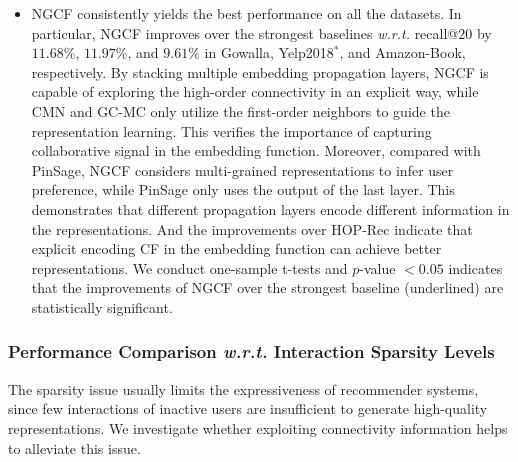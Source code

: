 \documentclass[sigconf]{acmart}
\newcommand{\wrt}{\emph{w.r.t. }}
\theoremstyle{definition}
\begin{document}
\begin{itemize}[leftmargin=*]
\item NGCF consistently yields the best performance on all the datasets.
In particular, NGCF improves over the strongest baselines \wrt recall@$20$ by $11.68\%$, $11.97\%$, and $9.61\%$ in Gowalla, Yelp2018$^{*}$, and Amazon-Book, respectively.
By stacking multiple embedding propagation layers, NGCF is capable of exploring the high-order connectivity in an explicit way, while CMN and GC-MC only utilize the first-order neighbors to guide the representation learning.
This verifies the importance of capturing collaborative signal in the embedding function.
Moreover, compared with PinSage, NGCF considers multi-grained representations to infer user preference, while PinSage only uses the output of the last layer.
This demonstrates that different propagation layers encode different information in the representations.
And the improvements over HOP-Rec indicate that explicit encoding CF in the embedding function can achieve better representations.
We conduct one-sample t-tests and $p$-value $<0.05$ indicates that the improvements of NGCF over the strongest baseline (underlined) are statistically significant.

\end{itemize}


\subsubsection{\textbf{Performance Comparison \wrt Interaction Sparsity Levels}}\label{sec:sparsity}



The sparsity issue usually limits the expressiveness of recommender systems, since few interactions of inactive users are insufficient to generate high-quality representations.
We investigate whether exploiting connectivity information helps to alleviate this issue.
\end{document}
